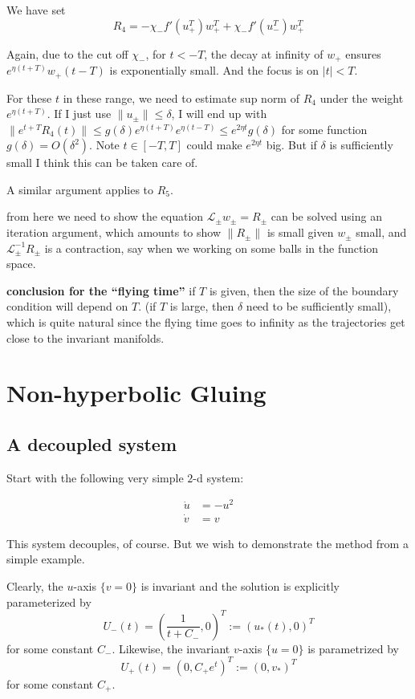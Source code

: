 \documentclass[letterpaper,11pt]{article}
\numberwithin{equation}{section}
\theoremstyle{plain}
\begin{document}
\begin{enumerate}
We have set
\[
R_4 = -  \chi_-f'(u^T_+)w^T_+ + \chi_-f'(u^T_-)w^T_+ 
\] 

Again, due to the cut off $\chi_-$, for $t<-T$, the decay at infinity of $w_+$ ensures $e^{\eta(t+T)}w_+(t-T)$ is exponentially small. And the focus is on $|t|<T$.

For these $t$ in these range, we need to estimate sup norm of $R_4$ under the weight $e^{\eta(t+T)}$. If I just use $\|u_\pm\|\le \delta$, I will end up with
$\|e^{t+T}R_4(t)\| \le g(\delta) e^{\eta(t+T)}e^{\eta(t-T)} \le e^{2\eta t} g(\delta)$ for some function $g(\delta) = O(\delta^2)$. Note $t\in [-T,T]$ could make $e^{2\eta t}$ big. But if $\delta$ is sufficiently small I think this can be taken care of.

A similar argument applies to $R_5$.

\end{enumerate}
from here we need to show the equation $\mathcal{L}_\pm w_\pm = R_\pm$ can be solved using an iteration argument, which amounts to show $\|R_\pm\|$ is small given $w_\pm$ small, and $\mathcal{L}_\pm^{-1}R_\pm$ is a contraction, say when we working on some balls in the function space.



\textbf{conclusion for the ``flying time''} if $T$ is given, then the size of the boundary condition will depend on $T$. (if $T$ is large, then $\delta$ need to be sufficiently small), which is quite natural since the flying time goes to infinity as the trajectories get close to the invariant manifolds.

\pagebreak

\section{Non-hyperbolic Gluing}
\subsection{A decoupled system}
Start with the following very simple $2$-d system:

\begin{align}\label{NH}
\dot{u} &= -u^2\\
\dot{v} &= v  \nonumber 
\end{align}

This system decouples, of course. But we wish to demonstrate the method from a simple example.

Clearly, the $u$-axis $\{v=0\}$ is invariant and the solution is explicitly parameterized by 
\[
U_-(t) = (\frac{1}{t+C_-},0)^T:=(u_*(t),0)^T
\] for some constant $C_-$. Likewise, the invariant $v$-axis $\{u=0\}$ is parametrized by 
\[
U_+(t) = (0, C_+e^t)^T:=(0,v_*)^T
\] for some constant $C_+$.
\end{document}

